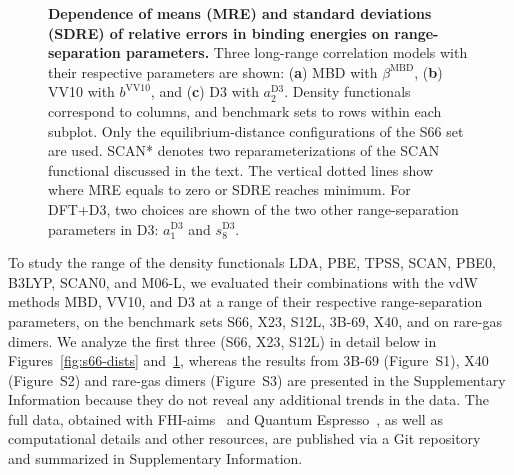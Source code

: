 \begin{figure}[t!]
{
}
\caption{\textbf{Dependence of means (MRE) and standard deviations (SDRE) of relative errors in binding energies on range-separation parameters.}
Three long-range correlation models with their respective parameters are shown: (\textbf a) MBD with $\beta^\text{MBD}$, (\textbf b) VV10 with $b^\text{VV10}$, and (\textbf c) D3 with $a_2^\text{D3}$.
Density functionals correspond to columns, and benchmark sets to rows within each subplot.
Only the equilibrium-distance configurations of the S66 set are used.
SCAN* denotes two reparameterizations of the SCAN functional discussed in the text. %
The vertical dotted lines show where MRE equals to zero or SDRE reaches minimum.
For DFT+D3, two choices are shown of the two other range-separation parameters in D3: $a_1^\text{D3}$ and $s_8^\text{D3}$.
}\label{fig:param-fitting}
\end{figure}

To study the range of the density functionals LDA, PBE, TPSS, SCAN, PBE0, B3LYP, SCAN0, and M06-L, we evaluated their combinations with the vdW methods MBD, VV10, and D3 at a range of their respective range-separation parameters, on the benchmark sets S66, X23, S12L, 3B-69, X40, and on rare-gas dimers.
We analyze the first three (S66, X23, S12L) in detail below in Figures~\ref{fig:s66-dists} and~\ref{fig:param-fitting}, whereas the results from 3B-69 (Figure~S1), X40 (Figure~S2) and rare-gas dimers (Figure~S3) are presented in the Supplementary Information because they do not reveal any additional trends in the data.
The full data, obtained with FHI-aims~\cite{BlumCPC09} and Quantum Espresso~\cite{GiannozziJPCM09,HamannPRB13}, as well as computational details and other resources, are published via a Git repository~\cite{GitRepo} and summarized in Supplementary Information.

